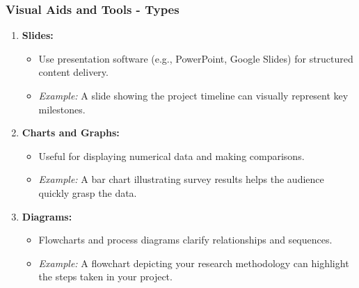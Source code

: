 \documentclass{beamer}
\begin{document}
\begin{frame}[fragile]
    \frametitle{Visual Aids and Tools - Types}
    \begin{enumerate}
        \item \textbf{Slides:} 
            \begin{itemize}
                \item Use presentation software (e.g., PowerPoint, Google Slides) for structured content delivery.
                \item \textit{Example:} A slide showing the project timeline can visually represent key milestones.
            \end{itemize}
        \item \textbf{Charts and Graphs:}
            \begin{itemize}
                \item Useful for displaying numerical data and making comparisons.
                \item \textit{Example:} A bar chart illustrating survey results helps the audience quickly grasp the data.
            \end{itemize}
        \item \textbf{Diagrams:}
            \begin{itemize}
                \item Flowcharts and process diagrams clarify relationships and sequences.
                \item \textit{Example:} A flowchart depicting your research methodology can highlight the steps taken in your project.
            \end{itemize}
    \end{enumerate}
\end{frame}
\end{document}
